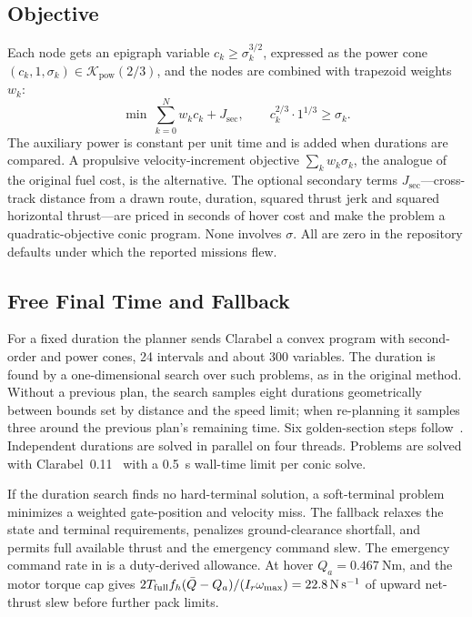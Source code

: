 \documentclass[10pt,letterpaper]{article}
\begin{document}
\subsection{Objective}
\label{sec:objective}

Each node gets an epigraph variable $c_k \ge \sigma_k^{3/2}$, expressed as the power cone $(c_k, 1, \sigma_k) \in \mathcal{K}_{\text{pow}}(2/3)$, and the nodes are combined with trapezoid weights $w_k$:
\begin{equation}
\min\ \sum_{k=0}^{N} w_k c_k + J_{\text{sec}}, \qquad c_k^{2/3}\cdot 1^{1/3} \ge \sigma_k .
\label{eq:energy}
\end{equation}
The auxiliary power is constant per unit time and is added when durations are compared.
A propulsive velocity-increment objective $\sum_k w_k\sigma_k$, the analogue of the original fuel cost, is the alternative.
The optional secondary terms $J_{\text{sec}}$---cross-track distance from a drawn route, duration, squared thrust jerk and squared horizontal thrust---are priced in seconds of hover cost and make the problem a quadratic-objective conic program.
None involves $\sigma$.
All are zero in the repository defaults under which the reported missions flew.

\subsection{Free Final Time and Fallback}
\label{sec:freetime}

For a fixed duration the planner sends Clarabel a convex program with second-order and power cones, 24 intervals and about 300 variables.
The duration is found by a one-dimensional search over such problems, as in the original method.
Without a previous plan, the search samples eight durations geometrically between bounds set by distance and the speed limit; when re-planning it samples three around the previous plan's remaining time.
Six golden-section steps follow~\cite{kiefer1953}.
Independent durations are solved in parallel on four threads.
Problems are solved with Clarabel~0.11~\cite{goulart2024clarabel} with a \SI{0.5}{\second} wall-time limit per conic solve.

If the duration search finds no hard-terminal solution, a soft-terminal problem minimizes a weighted gate-position and velocity miss.
The fallback relaxes the state and terminal requirements, penalizes ground-clearance shortfall, and permits full available thrust and the emergency command slew.
The emergency command rate in  is a duty-derived allowance. At hover $Q_a=\SI{0.467}{\newton\metre}$, and the motor torque cap gives $2T_{\text{full}}f_h(\bar Q-Q_a)/(I_r\omega_{\max})=\SI{22.8}{\newton\per\second}$ of upward net-thrust slew before further pack limits.
\end{document}
